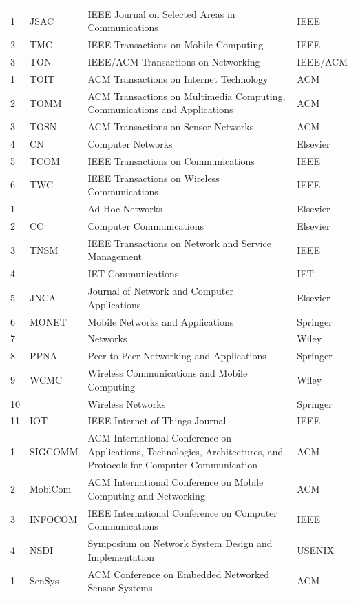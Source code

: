 \documentclass[doctor, vlined, ]{DissertUESTC}
\begin{document}
\begin{longtable}{p{2em} p{4.5em} p{20em} p{6em}}
		1 & JSAC & IEEE Journal on Selected Areas in Communications & IEEE \\
		2 & TMC & IEEE Transactions on Mobile Computing & IEEE \\
		3 & TON & IEEE/ACM Transactions on Networking & IEEE/ACM \\
		1 & TOIT & ACM Transactions on Internet Technology & ACM \\
		2 & TOMM & ACM Transactions on Multimedia Computing, Communications and Applications & ACM \\
		3 & TOSN & ACM Transactions on Sensor Networks & ACM \\
		4 & CN & Computer Networks & Elsevier \\
		5 & TCOM & IEEE Transactions on Communications & IEEE \\
		6 & TWC & IEEE Transactions on Wireless Communications & IEEE \\
		1 & & Ad Hoc Networks & Elsevier \\
		2 & CC & Computer Communications & Elsevier \\
		3 & TNSM & IEEE Transactions on Network and Service Management & IEEE \\
		4 & & IET Communications & IET \\
		5 & JNCA & Journal of Network and Computer Applications & Elsevier \\
		6 & MONET & Mobile Networks and Applications & Springer \\
		7 & & Networks & Wiley \\
		8 & PPNA & Peer-to-Peer Networking and Applications & Springer \\
		9 & WCMC & Wireless Communications and Mobile Computing & Wiley \\
		10 & & Wireless Networks & Springer \\
		11 & IOT & IEEE Internet of Things Journal & IEEE \\
		1 & SIGCOMM & ACM International Conference on Applications, Technologies, Architectures, and Protocols for Computer Communication & ACM \\
		2 & MobiCom & ACM International Conference on Mobile Computing and Networking & ACM \\
		3 & INFOCOM & IEEE International Conference on Computer Communications & IEEE \\
		4 & NSDI & Symposium on Network System Design and Implementation & USENIX \\
		1 & SenSys & ACM Conference on Embedded Networked Sensor Systems & ACM \\

\end{longtable}
\end{document}
